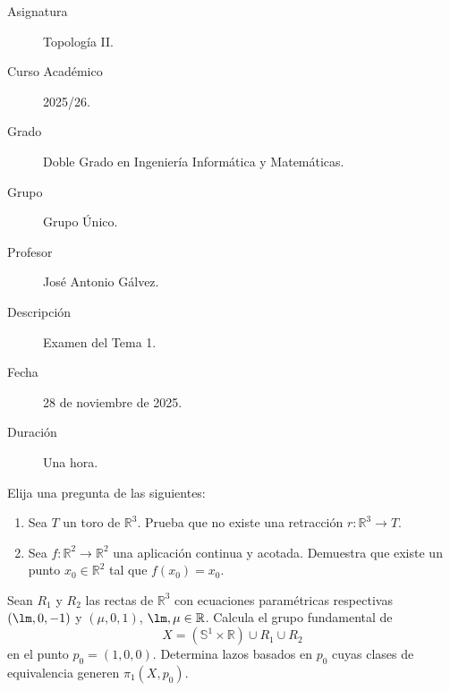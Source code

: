 \documentclass[12pt]{article}
\begin{document}

    
    

    \begin{description}
        \item[Asignatura] Topología II.
        \item[Curso Académico] 2025/26.
        \item[Grado] Doble Grado en Ingeniería Informática y Matemáticas.
        \item[Grupo] Grupo Único.
        \item[Profesor] José Antonio Gálvez.
        \item[Descripción] Examen del Tema 1.
        \item[Fecha] 28 de noviembre de 2025.
        \item[Duración] Una hora.
    \end{description}
    \newpage



    \begin{ejercicio}[5 puntos]
        Elija una pregunta de las siguientes:
        \begin{enumerate}[label=\alph*)]
            \item Sea $T$ un toro de $\mathbb{R}^3$. Prueba que no existe una retracción $r:\mathbb{R}^3\to T$.
            \item Sea $f:\mathbb{R}^2\to \mathbb{R}^2$ una aplicación continua y acotada. Demuestra que existe un punto $x_0\in \mathbb{R}^2$ tal que $f(x_0) = x_0$.
        \end{enumerate}
    \end{ejercicio}

    \begin{ejercicio}
        Sean $R_1$ y $R_2$ las rectas de $\mathbb{R}^3$ con ecuaciones paramétricas respectivas $(\lm,0,-1)$ y $(\mu,0,1)$, $\lm,\mu\in \mathbb{R}$. Calcula el grupo fundamental de
        \begin{equation*}
            X = (\mathbb{S}^1\times \mathbb{R}) \cup R_1 \cup R_2
        \end{equation*}
        en el punto $p_0 = (1,0,0)$. Determina lazos basados en $p_0$ cuyas clases de equivalencia generen $\pi_1(X,p_0)$.
    \end{ejercicio}
\end{document}
